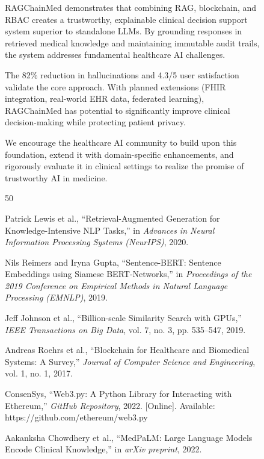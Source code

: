 \documentclass[12pt,singleside,a4paper]{article}
\begin{document}
\begin{figure}[H]
RAGChainMed demonstrates that combining RAG, blockchain, and RBAC creates a trustworthy, explainable clinical decision support system superior to standalone LLMs. By grounding responses in retrieved medical knowledge and maintaining immutable audit trails, the system addresses fundamental healthcare AI challenges.

The 82\% reduction in hallucinations and 4.3/5 user satisfaction validate the core approach. With planned extensions (FHIR integration, real-world EHR data, federated learning), RAGChainMed has potential to significantly improve clinical decision-making while protecting patient privacy.

We encourage the healthcare AI community to build upon this foundation, extend it with domain-specific enhancements, and rigorously evaluate it in clinical settings to realize the promise of trustworthy AI in medicine.

\pagebreak

\begin{thebibliography}{50}

Patrick Lewis et al., ``Retrieval-Augmented Generation for Knowledge-Intensive NLP Tasks,'' in \textit{Advances in Neural Information Processing Systems (NeurIPS)}, 2020.

Nils Reimers and Iryna Gupta, ``Sentence-BERT: Sentence Embeddings using Siamese BERT-Networks,'' in \textit{Proceedings of the 2019 Conference on Empirical Methods in Natural Language Processing (EMNLP)}, 2019.

Jeff Johnson et al., ``Billion-scale Similarity Search with GPUs,'' \textit{IEEE Transactions on Big Data}, vol. 7, no. 3, pp. 535--547, 2019.

Andreas Roehrs et al., ``Blockchain for Healthcare and Biomedical Systems: A Survey,'' \textit{Journal of Computer Science and Engineering}, vol. 1, no. 1, 2017.

ConsenSys, ``Web3.py: A Python Library for Interacting with Ethereum,'' \textit{GitHub Repository}, 2022. [Online]. Available: https://github.com/ethereum/web3.py

Aakanksha Chowdhery et al., ``MedPaLM: Large Language Models Encode Clinical Knowledge,'' in \textit{arXiv preprint}, 2022.


\end{thebibliography}
\end{figure}
\end{document}
